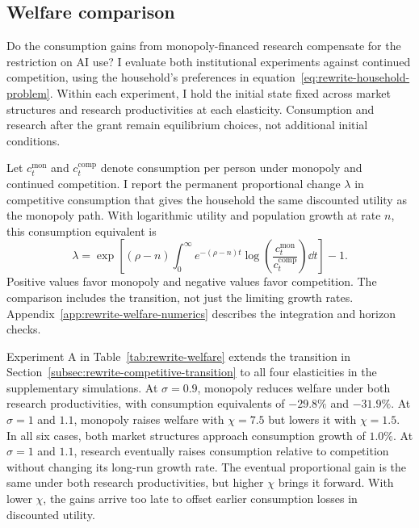 \subsection{Welfare comparison}
\label{subsec:rewrite-welfare}

Do the consumption gains from monopoly-financed research compensate for
the restriction on AI use? I evaluate both institutional experiments
against continued competition, using the household's preferences in
equation~\eqref{eq:rewrite-household-problem}. Within each experiment,
I hold the initial state fixed across market structures and research
productivities at each elasticity. Consumption and research after the grant
remain equilibrium choices, not additional initial conditions.

Let $c_t^{\mathrm{mon}}$ and $c_t^{\mathrm{comp}}$ denote consumption per
person under monopoly and continued competition. I report the permanent
proportional change $\lambda$ in competitive consumption that gives the
household the same discounted utility as the monopoly path. With
logarithmic utility and population growth at rate $n$, this
consumption equivalent is
\begin{equation}
 \lambda=\exp\!\left[
 (\rho-n)\int_0^\infty e^{-(\rho-n)t}
 \log\!\left(\frac{c_t^{\mathrm{mon}}}{c_t^{\mathrm{comp}}}\right)\dd t
 \right]-1.
 \label{eq:rewrite-welfare-equivalent}
\end{equation}
Positive values favor monopoly and negative values favor competition.
The comparison includes the transition,
not just the limiting growth rates. Appendix~\ref{app:rewrite-welfare-numerics}
describes the integration and horizon checks.



Experiment A in Table~\ref{tab:rewrite-welfare} extends the transition in
Section~\ref{subsec:rewrite-competitive-transition} to all four elasticities
in the supplementary simulations. At $\sigma=0.9$, monopoly reduces
welfare under both research productivities, with consumption equivalents
of $-29.8\%$ and $-31.9\%$. At $\sigma=1$ and $1.1$, monopoly raises
welfare with $\chi=7.5$ but lowers it with $\chi=1.5$. In all six cases,
both market structures approach consumption growth of $1.0\%$.
At $\sigma=1$ and $1.1$, research eventually raises consumption relative
to competition without changing its long-run growth rate. The eventual
proportional gain is the same under both research productivities, but
higher $\chi$ brings it forward. With lower $\chi$, the gains arrive too
late to offset earlier consumption losses in discounted utility.

